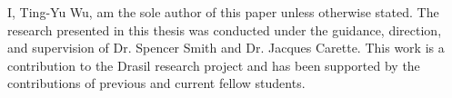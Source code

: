 
I, Ting-Yu Wu, am the sole author of this paper unless otherwise stated. The 
research presented in this thesis was conducted under the guidance, direction, 
and supervision of Dr. Spencer Smith and Dr. Jacques Carette. This work is a 
contribution to the Drasil research project and has been supported by the 
contributions of previous and current fellow students.